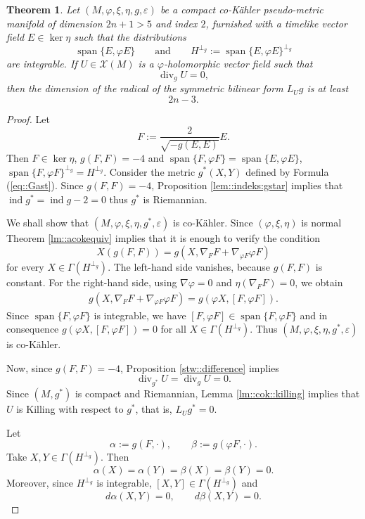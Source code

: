 \documentclass[12pt,a4paper,final]{amsart}
\numberwithin{equation}{section}
\newtheorem{tw}{Theorem}[section]
\theoremstyle{df}
\newcommand{\X}{\mathcal{X}}
\newcommand{\XM}{\X(M)}
\newcommand{\Span}{\operatorname{span}}
\newcommand{\eps}{\varepsilon}
\newcommand{\ind}{\operatorname{ind}}
\begin{document}
\begin{tw}\label{tw::radical}
Let $(M,\varphi,\xi,\eta,g,\eps)$ be a compact co-K\"ahler pseudo-metric
manifold of dimension $2n+1>5$ and index $2$, furnished with a timelike vector
field $E\in\ker\eta$ such that the distributions
$$
\Span\{E,\varphi E\}
\qquad\text{and}\qquad
H^{\perp_g}:=\Span\{E,\varphi E\}^{\perp_g}
$$
are integrable. If $U\in\XM$ is a $\varphi$-holomorphic vector field such that
$$
\operatorname{div}_gU=0,
$$
then the dimension of the radical of the symmetric bilinear form $L_Ug$ is at least
$$
2n-3.
$$
\end{tw}

\begin{proof}
Let
$$
F:=\frac{2}{\sqrt{-g(E,E)}}E.
$$
Then $F\in\ker\eta$, $g(F,F)=-4$ and
$\Span\{F,\varphi F\}=\Span\{E,\varphi E\}$, $\Span\{F,\varphi F\}^{\perp_g}=H^{\perp_g}$.
Consider the metric
$
g^\ast(X,Y)$ defined by Formula (\ref{eq::Gast}).
Since $g(F,F)=-4$, Proposition \ref{lem::indeks:gstar} implies that $\ind g^\ast=\ind g-2=0$ thus
$g^\ast$ is Riemannian.
\par We shall show that $(M,\varphi,\xi,\eta,g^\ast,\eps)$ is co-K\"ahler. Since $(\varphi,\xi,\eta)$ is normal Theorem \ref{lm::acokequiv} implies that
it is enough to verify the condition
$$
X(g(F,F))=g(X,\nabla_FF+\nabla_{\varphi F}\varphi F)
$$
for every $X\in\Gamma(H^{\perp_g})$.
The left-hand side vanishes, because $g(F,F)$ is constant. For the right-hand side,
using $\nabla\varphi=0$ and $\eta(\nabla_FF)=0$, we obtain
\begin{align*}
g(X,\nabla_FF+\nabla_{\varphi F}\varphi F)
=g(\varphi X,[F,\varphi F]).
\end{align*}
Since $\Span\{F,\varphi F\}$ is integrable, we have $[F,\varphi F]\in\Span\{F,\varphi F\}$ and in consequence $g(\varphi X,[F,\varphi F])=0$
for all $X\in\Gamma(H^{\perp_g})$. Thus $(M,\varphi,\xi,\eta,g^\ast,\eps)$ is co-K\"ahler.
\par Now, since $g(F,F)=-4$, Proposition \ref{stw::difference} implies
$$
\operatorname{div}_{g^\ast}U=\operatorname{div}_gU=0.
$$
Since $(M,g^\ast)$ is compact and Riemannian,
Lemma \ref{lm::cok::killing} implies that $U$ is Killing with respect to $g^\ast$,
that is, $L_Ug^\ast=0$.
\par Let
$$
\alpha:=g(F,\cdot),
\qquad
\beta:=g(\varphi F,\cdot).
$$
Take $X,Y\in\Gamma(H^{\perp_g})$. Then
$$
\alpha(X)=\alpha(Y)=\beta(X)=\beta(Y)=0.
$$
Moreover, since $H^{\perp_g}$ is integrable, $[X,Y]\in\Gamma(H^{\perp_g})$
and
$$
d\alpha(X,Y)=0,
\qquad
d\beta(X,Y)=0.
$$

\end{proof}
\end{document}
